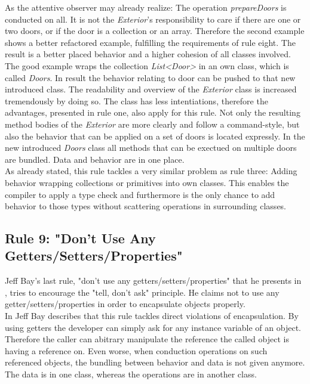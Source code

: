 As the attentive observer may already realize: The operation \textit{prepareDoors} is conducted on all. It is not the \textit{Exterior}'s responsibility to care if there are one or two doors, or if the door is a collection or an array. Therefore the second example shows a better refactored example, fulfilling the requirements of rule eight. The result is a better placed behavior and a higher cohesion of all classes involved.
\\

The good example wraps the collection \textit{List<Door>} in an own class, which is called \textit{Doors}. In result the behavior relating to door can be pushed to that new introduced class. The readability and overview of the \textit{Exterior} class is increased tremendously by doing so. The class has less intentiations, therefore the advantages, presented in rule one, also apply for this rule. Not only the resulting method bodies of the \textit{Exterior} are more clearly and follow a command-style, but also the behavior that can be applied on a set of doors is located expressly.
In the new introduced \textit{Doors} class all methods that can be exectued on multiple doors are bundled. Data and behavior are in one place. 
\\

As already stated, this rule tackles a very similar problem as rule three: Adding behavior wrapping collections or primitives into own classes. This enables the compiler to apply a type check and furthermore is the only chance to add behavior to those types without scattering operations in surrounding classes. 

\subsection*{Rule 9: "Don’t Use Any Getters/Setters/Properties"}
\label{describe:rule9}
Jeff Bay's last rule, "don't use any getters/setters/properties" that he presents in \cite{oc2008}, tries to encourage the "tell, don't ask"\cite{telldontaskoriginal} principle. He claims not to use any getter/setters/properties in order to encapsulate objects properly.
\\

In \cite[p. 79]{oc2008} Jeff Bay describes that this rule tackles direct violations of encapsulation. By using getters the developer can simply ask for any instance variable of an object. Therefore the caller can abitrary manipulate the reference the called object is having a reference on. Even worse, when conduction operations on such referenced objects, the bundling between behavior and data is not given anymore. The data is in one class, whereas the operations are in another class. 
\\

